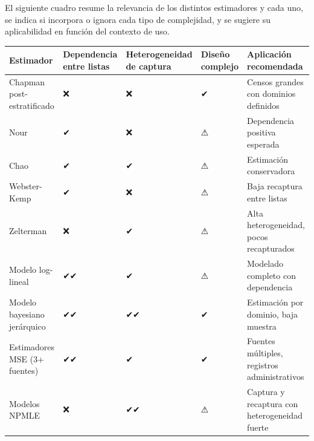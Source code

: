 \documentclass[
  12pt,
]{book}
\begin{document}
El siguiente cuadro resume la relevancia de los distintos estimadores y cada uno, se indica si incorpora o ignora cada tipo de complejidad, y se sugiere su aplicabilidad en función del contexto de uso.

\begin{longtable}[]{@{}
  >{\raggedright\arraybackslash}p{}
  >{\raggedright\arraybackslash}p{}
  >{\raggedright\arraybackslash}p{}
  >{\raggedright\arraybackslash}p{}
  >{\raggedright\arraybackslash}p{}@{}}
\toprule\noalign{}
\begin{minipage}[b]{\linewidth}\raggedright
Estimador
\end{minipage} & \begin{minipage}[b]{\linewidth}\raggedright
Dependencia entre listas
\end{minipage} & \begin{minipage}[b]{\linewidth}\raggedright
Heterogeneidad de captura
\end{minipage} & \begin{minipage}[b]{\linewidth}\raggedright
Diseño complejo
\end{minipage} & \begin{minipage}[b]{\linewidth}\raggedright
Aplicación recomendada
\end{minipage} \\
\midrule\noalign{}
\endhead
\bottomrule\noalign{}
\endlastfoot
Chapman post-estratificado & ❌ & ❌ & ✔ & Censos grandes con dominios definidos \\
Nour & ✔ & ❌ & ⚠ & Dependencia positiva esperada \\
Chao & ✔ & ✔ & ⚠ & Estimación conservadora \\
Webster-Kemp & ✔ & ❌ & ⚠ & Baja recaptura entre listas \\
Zelterman & ❌ & ✔ & ⚠ & Alta heterogeneidad, pocos recapturados \\
Modelo log-lineal & ✔✔ & ✔ & ⚠ & Modelado completo con dependencia \\
Modelo bayesiano jerárquico & ✔✔ & ✔✔ & ✔ & Estimación por dominio, baja muestra \\
Estimadores MSE (3+ fuentes) & ✔✔ & ✔ & ✔ & Fuentes múltiples, registros administrativos \\
Modelos NPMLE & ❌ & ✔✔ & ⚠ & Captura y recaptura con heterogeneidad fuerte \\
\end{longtable}
\end{document}
